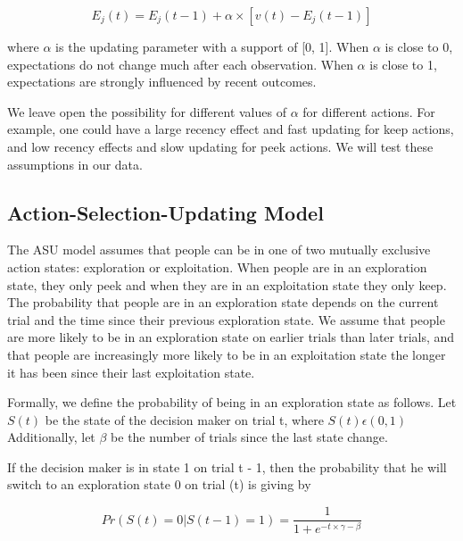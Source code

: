 \documentclass[a4paper,doc,natbib,floatsintext]{apa6}\usepackage[]{graphicx}\usepackage[]{color}
\begin{document}
\begin{center}
\begin{equation}
\label{eq:updating}

E_{j}(t)=E_{j}(t-1)+\alpha \times [v(t) - E_{j}(t-1)]

\end{equation}
\end{center}

where $\alpha$ is the updating parameter with a support of [0, 1]. When $\alpha$ is close to 0, expectations do not change much after each observation. When $\alpha$ is close to 1, expectations are strongly influenced by recent outcomes.

We leave open the possibility for different values of $\alpha$ for different actions. For example, one could have a large recency effect and fast updating for keep actions, and low recency effects and slow updating for peek actions. We will test these assumptions in our data.

\subsection{Action-Selection-Updating Model}

The ASU model assumes that people can be in one of two mutually exclusive action states: exploration or exploitation. When people are in an exploration state, they only peek and when they are in an exploitation state they only keep. The probability that people are in an exploration state depends on the current trial and the time since their previous exploration state. We assume that people are more likely to be in an exploration state on earlier trials than later trials, and that people are increasingly more likely to be in an exploitation state the longer it has been since their last exploitation state.

Formally, we define the probability of being in an exploration state as follows. Let $S(t)$ be the state of the decision maker on trial t, where $S(t) \epsilon (0, 1)$ Additionally, let $\beta$ be the number of trials since the last state change.

If the decision maker is in state 1 on trial t - 1, then the probability that he will switch to an exploration state 0 on trial (t) is giving by

\begin{center}
\begin{equation}
\label{eq:modeswitch}

Pr(S(t)=0|S(t-1) = 1)= \frac{1}{1 + e^{-t \times \gamma - \beta}}

\end{equation}
\end{center}
\end{document}
